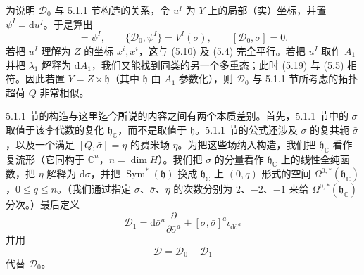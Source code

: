 \documentclass[11pt,a4paper,UTF8]{ctexart}
\theoremstyle{plain}
\theoremstyle{definition}
\begin{document}
为说明 $\mathcal D_0$ 与 5.1.1 节构造的关系，令 $u^I$ 为 $Y$ 上的局部（实）坐标，并置 $\psi^I=\mathrm du^I$。于是算出
\begin{equation}
    [\mathcal D_0,u^I]=\psi^I,\qquad
    \{\mathcal D_0,\psi^I\}=V^I(\sigma),\qquad
    [\mathcal D_0,\sigma]=0.
    \tag{5.19}
\end{equation}
若把 $u^I$ 理解为 $Z$ 的坐标 $x^i,\bar x^{\bar i}$，这与 (5.10) 及 (5.4) 完全平行。若把 $u^I$ 取作 $A_1$ 并把 $\lambda_1$ 解释为 $\mathrm dA_1$，我们又能找到同类的另一个多重态；此时 (5.19) 与 (5.5) 相符。因此若置 $Y=Z\times\mathfrak h$（其中 $\mathfrak h$ 由 $A_1$ 参数化），则 $\mathcal D_0$ 与 5.1.1 节所考虑的拓扑超荷 $Q$ 非常相似。

5.1.1 节的构造与这里迄今所说的内容之间有两个本质差别。首先，5.1.1 节中的 $\sigma$ 取值于该李代数的复化 $\mathfrak h_{\mathbb C}$，而不是取值于 $\mathfrak h$。5.1.1 节的公式还涉及 $\sigma$ 的复共轭 $\bar\sigma$，以及一个满足 $[Q,\bar\sigma]=\eta$ 的费米场 $\eta$。为把这些场纳入构造，我们把 $\mathfrak h_{\mathbb C}$ 看作复流形（它同构于 $\mathbb C^n$，$n=\dim H$）。我们把 $\sigma$ 的分量看作 $\mathfrak h_{\mathbb C}$ 上的线性全纯函数，把 $\eta$ 解释为 $\mathrm d\bar\sigma$，并把 $\operatorname{Sym}^*(\mathfrak h)$ 换成 $\mathfrak h_{\mathbb C}$ 上 $(0,q)$ 形式的空间 $\Omega^{0,*}(\mathfrak h_{\mathbb C})$，$0\le q\le n$。（我们通过指定 $\sigma$、$\bar\sigma$、$\eta$ 的次数分别为 $2$、$-2$、$-1$ 来给 $\Omega^{0,*}(\mathfrak h_{\mathbb C})$ 分次。）最后定义
\begin{equation}
    \mathcal D_1=\mathrm d\bar\sigma^a\frac{\partial}{\partial\bar\sigma^a}
    +[\sigma,\bar\sigma]^a\iota_{\mathrm d\bar\sigma^a}
    \tag{5.20}
\end{equation}
并用
\begin{equation}
    \mathcal D=\mathcal D_0+\mathcal D_1
    \tag{5.21}
\end{equation}
代替 $\mathcal D_0$。

\end{document}
